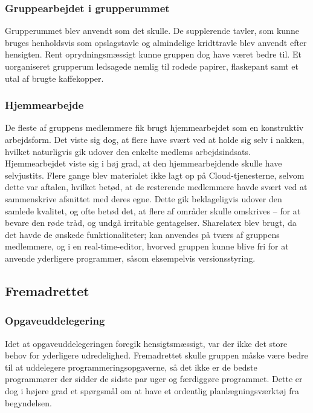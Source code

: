 \subsubsection{Gruppearbejdet i grupperummet} 
Grupperummet blev anvendt som det skulle. De supplerende tavler, som kunne bruges henholdsvis som opslagstavle og almindelige kridttravle blev anvendt efter hensigten. Rent oprydningsmæssigt kunne gruppen dog have været bedre til. Et uorganiseret grupperum ledsagede nemlig til rodede papirer, flaskepant samt et utal af brugte kaffekopper. \\

\subsubsection{Hjemmearbejde} 
De fleste af gruppens medlemmere fik brugt hjemmearbejdet som en konstruktiv arbejdsform. Det viste sig dog, at flere have svært ved at holde sig selv i nakken, hvilket naturligvis gik udover den enkelte medlems arbejdsindsats. Hjemmearbejdet viste sig i høj grad, at den hjemmearbejdende skulle have selvjustits. Flere gange blev materialet ikke lagt op på Cloud-tjenesterne, selvom dette var aftalen, hvilket betød, at de resterende medlemmere havde svært ved at sammenskrive afsnittet med deres egne. Dette gik beklageligvis udover den samlede kvalitet, og ofte betød det, at flere af områder skulle omskrives – for at bevare den røde tråd, og undgå irritable gentagelser. Sharelatex blev brugt, da det havde de ønskede funktionaliteter; kan anvendes på tværs af gruppens medlemmere, og i en real-time-editor, hvorved gruppen kunne blive fri for at anvende yderligere programmer, såsom eksempelvis versionsstyring. 

\subsection{Fremadrettet}
\subsubsection{Opgaveuddelegering} 
Idet at opgaveuddelegeringen foregik hensigtsmæssigt, var der ikke det store behov for yderligere udredelighed. Fremadrettet skulle gruppen måske være bedre til at uddelegere programmeringsopgaverne, så det ikke er de bedste programmører der sidder de sidste par uger og færdiggøre programmet. Dette er dog i højere grad et spørgsmål om at have et ordentlig planlægningsværktøj fra begyndelsen. \\

